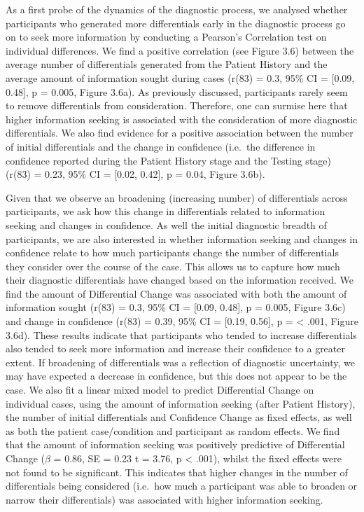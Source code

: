 \documentclass[a4paper, nobind]{templates/ociamthesis}
\begin{document}
As a first probe of the dynamics of the diagnostic process, we analysed whether participants who generated more differentials early in the diagnostic process go on to seek more information by conducting a Pearson's Correlation test on individual differences. We find a positive correlation (see Figure 3.6) between the average number of differentials generated from the Patient History and the average amount of information sought during cases (r(83) = 0.3, 95\% CI = {[}0.09, 0.48{]}, p = 0.005, Figure 3.6a). As previously discussed, participants rarely seem to remove differentials from consideration. Therefore, one can surmise here that higher information seeking is associated with the consideration of more diagnostic differentials. We also find evidence for a positive association between the number of initial differentials and the change in confidence (i.e.~the difference in confidence reported during the Patient History stage and the Testing stage) (r(83) = 0.23, 95\% CI = {[}0.02, 0.42{]}, p = 0.04, Figure 3.6b).

\hfill\break
Given that we observe an broadening (increasing number) of differentials across participants, we ask how this change in differentials related to information seeking and changes in confidence. As well the initial diagnostic breadth of participants, we are also interested in whether information seeking and changes in confidence relate to how much participants change the number of differentials they consider over the course of the case. This allows us to capture how much their diagnostic differentials have changed based on the information received. We find the amount of Differential Change was associated with both the amount of information sought (r(83) = 0.3, 95\% CI = {[}0.09, 0.48{]}, p = 0.005, Figure 3.6c) and change in confidence (r(83) = 0.39, 95\% CI = {[}0.19, 0.56{]}, p = \textless{} .001, Figure 3.6d). These results indicate that participants who tended to increase differentials also tended to seek more information and increase their confidence to a greater extent. If broadening of differentials was a reflection of diagnostic uncertainty, we may have expected a decrease in confidence, but this does not appear to be the case. We also fit a linear mixed model to predict Differential Change on individual cases, using the amount of information seeking (after Patient History), the number of initial differentials and Confidence Change as fixed effects, as well as both the patient case/condition and participant as random effects. We find that the amount of information seeking was positively predictive of Differential Change (\(\beta\) = 0.86, SE = 0.23 t = 3.76, p \textless{} .001), whilst the fixed effects were not found to be significant. This indicates that higher changes in the number of differentials being considered (i.e.~how much a participant was able to broaden or narrow their differentials) was associated with higher information seeking.
\end{document}
